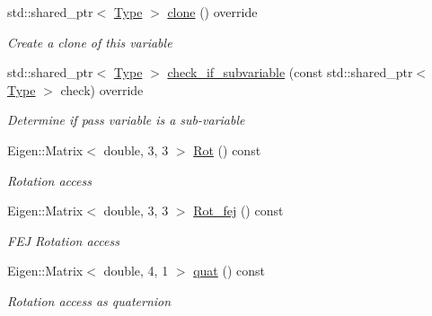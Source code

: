 \begin{DoxyCompactItemize}
\mbox{\label{classov__type_1_1PoseJPL_a0c4347fb6a988470ed5236421987d92a}} 
std\+::shared\+\_\+ptr$<$ \hyperlink{classov__type_1_1Type}{Type} $>$ \hyperlink{classov__type_1_1PoseJPL_a0c4347fb6a988470ed5236421987d92a}{clone} () override
\begin{DoxyCompactList}\small\item\em Create a clone of this variable \end{DoxyCompactList}\item 
std\+::shared\+\_\+ptr$<$ \hyperlink{classov__type_1_1Type}{Type} $>$ \hyperlink{classov__type_1_1PoseJPL_aa2138dce0eef761ebbeacc0136da34cc}{check\+\_\+if\+\_\+subvariable} (const std\+::shared\+\_\+ptr$<$ \hyperlink{classov__type_1_1Type}{Type} $>$ check) override
\begin{DoxyCompactList}\small\item\em Determine if pass variable is a sub-\/variable \end{DoxyCompactList}\item 
\mbox{\label{classov__type_1_1PoseJPL_aa48c6c3747ec401d1873ef94e3ad7ee2}} 
Eigen\+::\+Matrix$<$ double, 3, 3 $>$ \hyperlink{classov__type_1_1PoseJPL_aa48c6c3747ec401d1873ef94e3ad7ee2}{Rot} () const
\begin{DoxyCompactList}\small\item\em Rotation access \end{DoxyCompactList}\item 
\mbox{\label{classov__type_1_1PoseJPL_a9e9e9bf657e838f5b1e48e8eecfd1781}} 
Eigen\+::\+Matrix$<$ double, 3, 3 $>$ \hyperlink{classov__type_1_1PoseJPL_a9e9e9bf657e838f5b1e48e8eecfd1781}{Rot\+\_\+fej} () const
\begin{DoxyCompactList}\small\item\em F\+EJ Rotation access \end{DoxyCompactList}\item 
\mbox{\label{classov__type_1_1PoseJPL_a533fcdd266d777a1e5c419361d7e7b35}} 
Eigen\+::\+Matrix$<$ double, 4, 1 $>$ \hyperlink{classov__type_1_1PoseJPL_a533fcdd266d777a1e5c419361d7e7b35}{quat} () const
\begin{DoxyCompactList}\small\item\em Rotation access as quaternion \end{DoxyCompactList}\item 

\end{DoxyCompactItemize}
